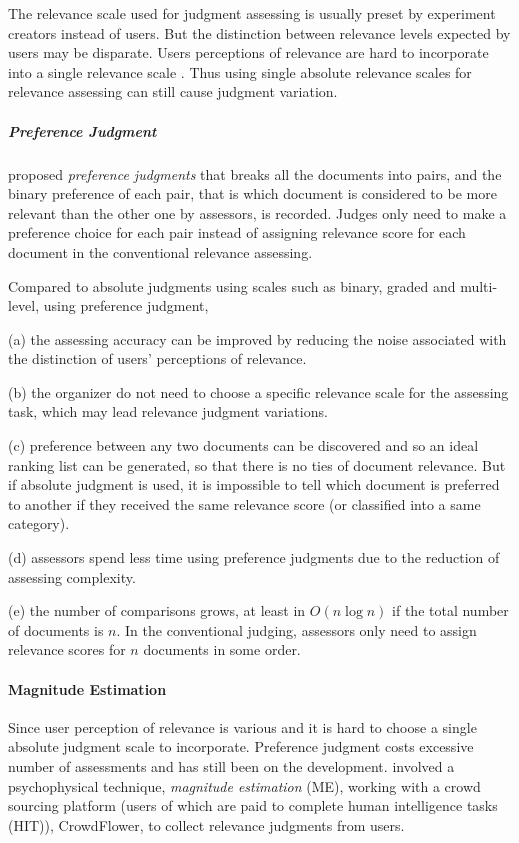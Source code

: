 \documentclass{article}
\begin{document}
The relevance scale used for judgment assessing is usually preset by experiment creators instead of users. But the distinction between relevance levels expected by users may be disparate. Users perceptions of relevance are hard to incorporate into a single relevance scale \citet{benefits.ME}. Thus using single absolute relevance scales for relevance assessing can still cause judgment variation. 

\subparagraph{Preference Judgment}
\citet{here.or.there} proposed \textit{preference judgments} that breaks all the documents into pairs, and the binary preference of each pair, that is which document is considered to be more relevant than the other one by assessors, is recorded. Judges only need to make a preference choice for each pair instead of assigning relevance score for each document in the conventional relevance assessing.

Compared to absolute judgments using scales such as binary, graded and multi-level, using preference judgment,

(a) the assessing accuracy can be improved by reducing the noise associated with the distinction of users' perceptions of relevance. 

(b) the organizer do not need to choose a specific relevance scale for the assessing task, which may lead relevance judgment variations. 

(c) preference between any two documents can be discovered and so an ideal ranking list can be generated, so that there is no ties of document relevance. But if absolute judgment is used, it is impossible to tell which document is preferred to another if they received the same relevance score (or classified into a same category). 

(d) assessors spend less time using preference judgments due to the reduction of assessing complexity. 

(e) the number of comparisons grows, at least in $O(n\log n)$ if the total number of documents is $n$. In the conventional judging, assessors only need to assign relevance scores for $n$ documents in some order.


\paragraph{Magnitude Estimation}
Since user perception of relevance is various and it is hard to choose a single absolute judgment scale to incorporate. Preference judgment costs excessive number of assessments and has still been on the development. \citet{benefits.ME} involved a psychophysical technique, \textit{magnitude estimation} (ME), working with a crowd sourcing platform (users of which are paid to complete human intelligence tasks (HIT)), CrowdFlower, to collect relevance judgments from users. 
\end{document}
